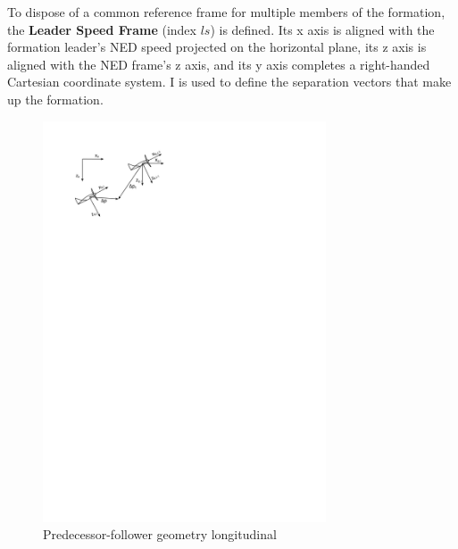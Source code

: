 \documentclass{ifacconf}
\begin{document}

To dispose of a common reference frame for multiple members of the formation, the \textbf{Leader Speed Frame} (index $ls$) is defined. Its x axis is aligned with the formation leader's NED speed projected on the horizontal plane, its z axis is aligned with the NED frame's z axis, and its y axis completes a right-handed Cartesian coordinate system. I is used to define the separation vectors that make up the formation.

\begin{figure}
\begin{center}
\includegraphics[width=8.4cm]{frames}    %
\caption{Predecessor-follower geometry longitudinal} 
\label{fig:frames}
\end{center}
\end{figure}
\end{document}
